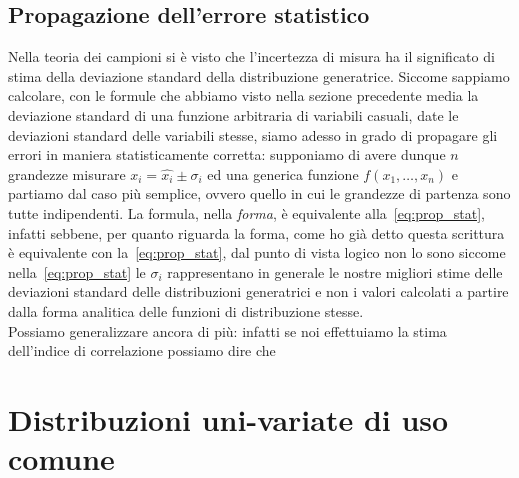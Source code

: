 \documentclass{report}
\begin{document}
\section{Propagazione dell'errore statistico}
Nella teoria dei campioni si è visto che l'incertezza di misura ha il significato di stima della deviazione standard della distribuzione generatrice. Siccome sappiamo calcolare, con le formule che abbiamo visto nella sezione precedente media la deviazione standard di una funzione arbitraria di variabili casuali, date le deviazioni standard delle variabili stesse, siamo adesso in grado di propagare gli errori in maniera statisticamente corretta: supponiamo di avere dunque $n$ grandezze misurare $x_i = \hat{x_i} \pm \sigma_i$ ed una generica funzione $f(x_1, \ldots, x_n)$ e partiamo dal caso più semplice, ovvero quello in cui le grandezze di partenza sono tutte indipendenti. La formula, nella \emph{forma}, è equivalente alla~\ref{eq:prop_stat}, infatti
sebbene, per quanto riguarda la forma, come ho già detto questa scrittura è equivalente con la~\ref{eq:prop_stat}, dal punto di vista logico non lo sono siccome nella~\ref{eq:prop_stat} le $\sigma_i$ rappresentano in generale le nostre migliori stime delle deviazioni standard delle distribuzioni generatrici e non i valori calcolati a partire dalla forma analitica delle funzioni di distribuzione stesse. \\
Possiamo generalizzare ancora di più: infatti se noi effettuiamo la stima dell'indice di correlazione possiamo dire che
\chapter{Distribuzioni uni-variate di uso comune}
\end{document}
